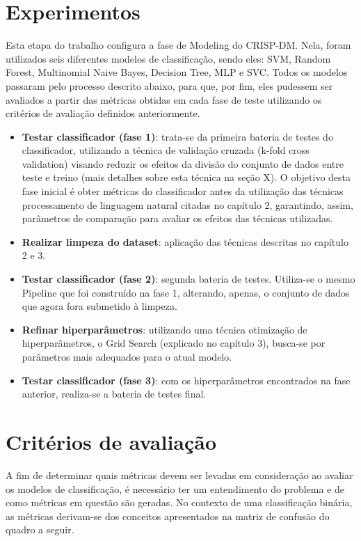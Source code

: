 \section{Experimentos}

Esta etapa do trabalho configura a fase de Modeling do CRISP-DM. Nela, foram utilizados seis diferentes modelos de classificação, sendo eles: SVM, Random Forest, Multinomial Naive Bayes, Decision Tree, MLP e SVC. Todos os modelos passaram pelo processo descrito abaixo, para que, por fim, eles pudessem ser avaliados a partir das métricas obtidas em cada fase de teste utilizando os critérios de avaliação definidos anteriormente.

\begin{itemize}
    \item \textbf{Testar classificador (fase 1)}: trata-se da primeira bateria de testes do classificador, utilizando a técnica de validação cruzada (k-fold cross validation) visando reduzir os efeitos da divisão do conjunto de dados entre teste e treino (mais detalhes sobre esta técnica na seção X). O objetivo desta fase inicial é obter métricas do classificador antes da utilização das técnicas processamento de linguagem natural citadas no capítulo 2, garantindo, assim, parâmetros de comparação para avaliar os efeitos das técnicas utilizadas. 
    \item \textbf{Realizar limpeza do dataset}: aplicação das técnicas descritas no capítulo 2 e 3.
    \item \textbf{Testar classificador (fase 2)}: segunda bateria de testes. Utiliza-se o mesmo Pipeline que foi construído na fase 1, alterando, apenas, o conjunto de dados que agora fora submetido à limpeza.
    \item \textbf{Refinar hiperparâmetros}: utilizando uma técnica otimização de hiperparâmetros, o Grid Search (explicado no capítulo 3), busca-se por parâmetros mais adequados para o atual modelo.
    \item \textbf{Testar classificador (fase 3)}: com os hiperparâmetros encontrados na fase anterior, realiza-se a bateria de testes final.
\end{itemize}

\section{Critérios de avaliação}

A fim de determinar quais métricas devem ser levadas em consideração ao avaliar os modelos de classificação, é necessário ter um entendimento do problema e de como métricas em questão são geradas. No contexto de uma classificação binária, as métricas derivam-se dos conceitos apresentados na matriz de confusão do quadro a seguir.

